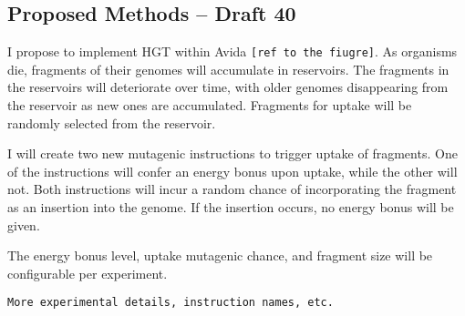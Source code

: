 \subsection{Proposed Methods – Draft 40}

I propose to implement HGT within Avida \verb|[ref to the fiugre]|.  As organisms die, fragments of their genomes will accumulate in reservoirs.  The fragments in the reservoirs will deteriorate over time, with older genomes disappearing from the reservoir as new ones are accumulated. Fragments for uptake will be randomly selected from the reservoir.  

I will create two new mutagenic instructions to trigger uptake of fragments. One of the instructions will confer an energy bonus upon uptake, while the other will not.  Both instructions will incur a random chance of incorporating the fragment as an insertion into the genome.  If the insertion occurs, no energy bonus will be given. 

The energy bonus level, uptake mutagenic chance, and fragment size will be configurable per experiment. 

\verb|More experimental details, instruction names, etc.|